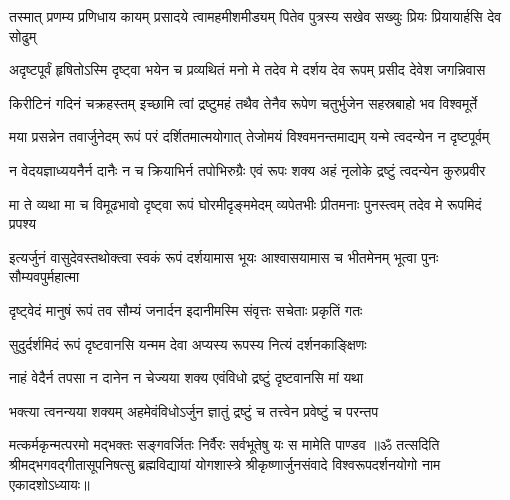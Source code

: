 \fourlineindentedshloka
{तस्मात् प्रणम्य प्रणिधाय कायम्}
{प्रसादये त्वामहमीशमीड्यम्}
{पितेव पुत्रस्य सखेव सख्युः}
{प्रियः प्रियायार्हसि देव सोढुम्}%

\fourlineindentedshloka
{अदृष्टपूर्वं हृषितोऽस्मि दृष्ट्वा}
{भयेन च प्रव्यथितं मनो मे}
{तदेव मे दर्शय देव रूपम्}
{प्रसीद देवेश जगन्निवास}%

\fourlineindentedshloka
{किरीटिनं गदिनं चक्रहस्तम्}
{इच्छामि त्वां द्रष्टुमहं तथैव}
{तेनैव रूपेण चतुर्भुजेन}
{सहस्रबाहो भव विश्वमूर्ते}%

\fourlineindentedshloka
{मया प्रसन्नेन तवार्जुनेदम्}
{रूपं परं दर्शितमात्मयोगात्}
{तेजोमयं विश्वमनन्तमाद्यम्}
{यन्मे त्वदन्येन न दृष्टपूर्वम्}%

\fourlineindentedshloka
{न वेदयज्ञाध्ययनैर्न दानैः}
{न च क्रियाभिर्न तपोभिरुग्रैः}
{एवं रूपः शक्य अहं नृलोके}
{द्रष्टुं त्वदन्येन कुरुप्रवीर}%

\fourlineindentedshloka
{मा ते व्यथा मा च विमूढभावो}
{दृष्ट्वा रूपं घोरमीदृङ्ममेदम्}
{व्यपेतभीः प्रीतमनाः पुनस्त्वम्}
{तदेव मे रूपमिदं प्रपश्य}%

\fourlineindentedshloka
{इत्यर्जुनं वासुदेवस्तथोक्त्वा}
{स्वकं रूपं दर्शयामास भूयः}
{आश्वासयामास च भीतमेनम्}
{भूत्वा पुनः सौम्यवपुर्महात्मा}%

\twolineshloka
{दृष्ट्वेदं मानुषं रूपं तव सौम्यं जनार्दन}
{इदानीमस्मि संवृत्तः सचेताः प्रकृतिं गतः}%

\twolineshloka
{सुदुर्दर्शमिदं रूपं दृष्टवानसि यन्मम}
{देवा अप्यस्य रूपस्य नित्यं दर्शनकाङ्क्षिणः}%

\twolineshloka
{नाहं वेदैर्न तपसा न दानेन न चेज्यया}
{शक्य एवंविधो द्रष्टुं दृष्टवानसि मां यथा}%

\twolineshloka
{भक्त्या त्वनन्यया शक्यम् अहमेवंविधोऽर्जुन}
{ज्ञातुं द्रष्टुं च तत्त्वेन प्रवेष्टुं च परन्तप}%

\twolineshloka
{मत्कर्मकृन्मत्परमो मद्भक्तः सङ्गवर्जितः}
{निर्वैरः सर्वभूतेषु यः स मामेति पाण्डव}%
{॥ॐ तत्सदिति श्रीमद्भगवद्गीतासूपनिषत्सु ब्रह्मविद्यायां योगशास्त्रे श्रीकृष्णार्जुनसंवादे विश्वरूपदर्शनयोगो नाम एकादशोऽध्यायः॥}
